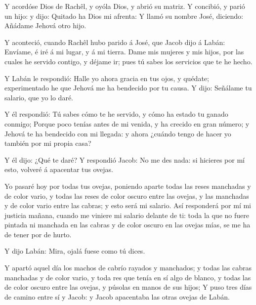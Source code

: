  Y acordóse Dios de Rachêl, y oyóla Dios, y abrió su
matriz.  Y concibió, y parió un hijo: y dijo: Quitado ha
Dios mi afrenta:  Y llamó su nombre José, diciendo: Añádame
Jehová otro hijo.

 Y aconteció, cuando Rachêl hubo parido á José, que Jacob
dijo á Labán: Envíame, é iré á mi lugar, y á mi tierra. 
Dame mis mujeres y mis hijos, por las cuales he servido contigo, y
déjame ir; pues tú sabes los servicios que te he hecho.

 Y Labán le respondió: Halle yo ahora gracia en tus ojos, y
quédate; experimentado he que Jehová me ha bendecido por tu causa.
 Y dijo: Señálame tu salario, que yo lo daré.

 Y él respondió: Tú sabes cómo te he servido, y cómo ha
estado tu ganado conmigo;  Porque poco tenías antes de mi
venida, y ha crecido en gran número; y Jehová te ha bendecido con mi
llegada: y ahora ¿cuándo tengo de hacer yo también por mi propia casa?

 Y él dijo: ¿Qué te daré? Y respondió Jacob: No me des
nada: si hicieres por mí esto, volveré á apacentar tus ovejas.

 Yo pasaré hoy por todas tus ovejas, poniendo aparte todas
las reses manchadas y de color vario, y todas las reses de color oscuro
entre las ovejas, y las manchadas y de color vario entre las cabras; y
esto será mi salario.  Así responderá por mí mi justicia
mañana, cuando me viniere mi salario delante de ti: toda la que no fuere
pintada ni manchada en las cabras y de color oscuro en las ovejas mías,
se me ha de tener por de hurto.

 Y dijo Labán: Mira, ojalá fuese como tú dices.

 Y apartó aquel día los machos de cabrío rayados y
manchados; y todas las cabras manchadas y de color vario, y toda res que
tenía en sí algo de blanco, y todas las de color oscuro entre las
ovejas, y púsolas en manos de sus hijos;  Y puso tres días
de camino entre sí y Jacob: y Jacob apacentaba las otras ovejas de
Labán.

